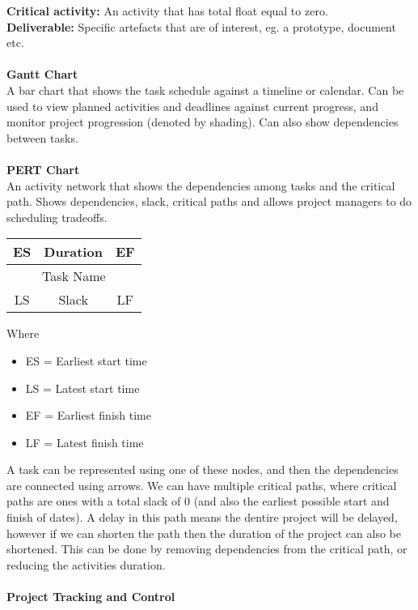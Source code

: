 \documentclass[a4paper,10pt]{article}
\begin{document}
\textbf{Critical activity:} An activity that has total float equal to zero. \\
\textbf{Deliverable:} Specific artefacts that are of interest, eg. a prototype, document etc. \\\\
\textcolor{BlueGreen}{\textbf{Gantt Chart}} \\
A bar chart that shows the task schedule against a timeline or calendar. Can be used to view planned activities and deadlines against current progress, and monitor project progression (denoted by shading). Can also show dependencies between tasks. \\\\
\newpage
\noindent \textcolor{BlueGreen}{\textbf{PERT Chart}} \\
An activity network that shows the dependencies among tasks and the critical path. Shows dependencies, slack, critical paths and allows project managers to do scheduling tradeoffs.\\
\begin{center}
	\begin{tabular}{|c|c|c|}
		\hline
		ES &Duration &EF \\
		\hline 
		\multicolumn{3}{|c|}{Task Name} \\
		\hline 
		LS &Slack &LF \\
		\hline
	\end{tabular}
\end{center}
\noindent Where 
\begin{itemize}
	\item ES = Earliest start time 
	\item LS = Latest start time 
	\item EF = Earliest finish time 
	\item LF = Latest finish time
\end{itemize}
A task can be represented using one of these nodes, and then the dependencies are connected using arrows. We can have multiple critical paths, where critical paths are ones with a total slack of 0 (and also the earliest possible start and finish of dates). A delay in this path means the dentire project will be delayed, however if we can shorten the path then the duration of the project can also be shortened. This can be done by removing dependencies from the critical path, or reducing the activities duration. \\\\
\textcolor{BlueGreen}{\textbf{Project Tracking and Control}} \\
\end{document}
